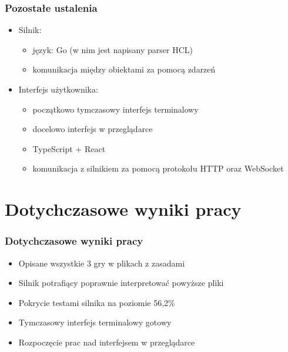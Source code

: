 \documentclass{beamer}
\begin{document}
\begin{frame}%
	\frametitle{Pozostałe ustalenia}
	\begin{itemize}
		\item Silnik:
		      \begin{itemize}
			      \item język: Go (w nim jest napisany parser HCL)
			      \item komunikacja między obiektami za pomocą zdarzeń %
		      \end{itemize}
		\item Interfejs użytkownika:
		      \begin{itemize}
			      \item początkowo tymczasowy interfejs terminalowy
			      \item docelowo interfejs w przeglądarce
			      \item TypeScript + React
			      \item komunikacja z silnikiem za pomocą protokołu HTTP oraz WebSocket
		      \end{itemize}
	\end{itemize}
\end{frame}

\section{Dotychczasowe wyniki pracy}

\begin{frame}
	\frametitle{Dotychczasowe wyniki pracy}
	\begin{itemize}
		\item Opisane wszystkie 3 gry w plikach z zasadami
		\item Silnik potrafiący poprawnie interpretować powyższe pliki
		\item Pokrycie testami silnika na poziomie 56,2\%
		\item Tymczasowy interfejs terminalowy gotowy
		\item Rozpoczęcie prac nad interfejsem w przeglądarce
	\end{itemize}
\end{frame}
\end{document}
